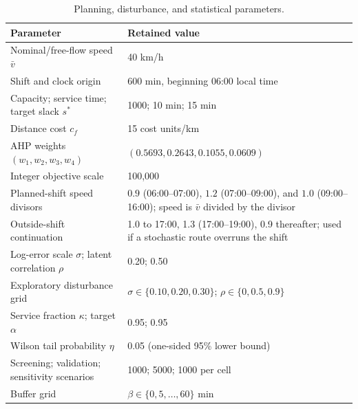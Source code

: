 \documentclass[11pt,a4paper]{article}
\begin{document}
\begin{table}[ht]
\centering
\small
\caption{Planning, disturbance, and statistical parameters.}
\label{tab:parameters}
\begin{tabular}{p{}p{}}
\toprule
Parameter & Retained value \\
\midrule
Nominal/free-flow speed $\bar v$ & 40 km/h \\
Shift and clock origin & 600 min, beginning 06:00 local time \\
Capacity; service time; target slack $s^*$ & 1000; 10 min; 15 min \\
Distance cost $c_f$ & 15 cost units/km \\
AHP weights $(w_1,w_2,w_3,w_4)$ & $(0.5693,0.2643,0.1055,0.0609)$ \\
Integer objective scale & 100,000 \\
Planned-shift speed divisors &
$0.9$ (06:00--07:00), $1.2$ (07:00--09:00), and $1.0$
(09:00--16:00); speed is $\bar v$ divided by the divisor \\
Outside-shift continuation & 1.0 to 17:00, 1.3 (17:00--19:00), 0.9 thereafter;
used if a stochastic route overruns the shift \\
Log-error scale $\sigma$; latent correlation $\rho$ & 0.20; 0.50 \\
Exploratory disturbance grid & $\sigma\in\{0.10,0.20,0.30\}$;
$\rho\in\{0,0.5,0.9\}$ \\
Service fraction $\kappa$; target $\alpha$ & 0.95; 0.95 \\
Wilson tail probability $\eta$ & 0.05 (one-sided 95\% lower bound) \\
Screening; validation; sensitivity scenarios & 1000; 5000; 1000 per cell \\
Buffer grid & $\beta\in\{0,5,\ldots,60\}$ min \\
\bottomrule
\end{tabular}
\end{table}
\end{document}
